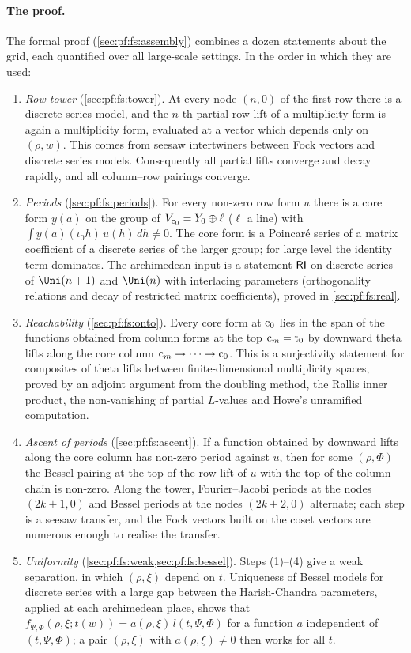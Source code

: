 \paragraph{The proof.}
The formal proof (\cref{sec:pf:fs:assembly}) combines a dozen statements about the grid, each quantified over all
large-scale settings. In the order in which they are used:
\begin{enumerate}[label=(\arabic*)]
\item \emph{Row tower} (\cref{sec:pf:fs:tower}). At every node $(n,0)$ of the first row there is a discrete series
model, and the $n$-th partial row lift of a multiplicity form is again a multiplicity form, evaluated at a vector
which depends only on $(\rho,w)$. This comes from seesaw intertwiners between Fock vectors and discrete series
models. Consequently all partial lifts converge and decay rapidly, and all column--row pairings converge.
\item \emph{Periods} (\cref{sec:pf:fs:periods}). For every non-zero row form $u$ there is a core form $y(a)$ on the group
of $V_{\mathrm{c}_0}=Y_0\oplus\ell$ ($\ell$ a line) with $\int y(a)(\iota_0h)\,u(h)\,dh\ne0$. The core form is a Poincar\'e series of
a matrix coefficient of a discrete series of the larger group; for large level the identity term dominates. The
archimedean input is a statement $\mathsf{RI}$ on discrete series of $\Uni(n+1)$ and $\Uni(n)$ with interlacing parameters
(orthogonality relations and decay of restricted matrix coefficients), proved in \cref{sec:pf:fs:real}.
\item \emph{Reachability} (\cref{sec:pf:fs:onto}). Every core form at $\mathrm{c}_0$ lies in the span of the functions obtained
from column forms at the top $\mathrm{c}_m=\mathrm{t}_0$ by downward theta lifts along the core column $\mathrm{c}_m\to\cdots\to\mathrm{c}_0$. This
is a surjectivity statement for composites of theta lifts between finite-dimensional multiplicity spaces, proved by
an adjoint argument from the doubling method, the Rallis inner product, the non-vanishing of partial $L$-values and
Howe's unramified computation.
\item \emph{Ascent of periods} (\cref{sec:pf:fs:ascent}). If a function obtained by downward lifts along the core column
has non-zero period against $u$, then for some $(\rho,\Phi)$ the Bessel pairing at the top of the row lift of $u$ with
the top of the column chain is non-zero. Along the tower, Fourier--Jacobi periods at the nodes $(2k+1,0)$ and Bessel
periods at the nodes $(2k+2,0)$ alternate; each step is a seesaw transfer, and the Fock vectors built on the coset
vectors are numerous enough to realise the transfer.
\item \emph{Uniformity} (\cref{sec:pf:fs:weak,sec:pf:fs:bessel}). Steps (1)--(4) give a weak separation, in which
$(\rho,\xi)$ depend on $t$. Uniqueness of Bessel models for discrete series with a large gap between the
Harish-Chandra parameters, applied at each archimedean place, shows that
$f_{\Psi,\Phi}(\rho,\xi;t(w))=a(\rho,\xi)\,l(t,\Psi,\Phi)$ for a function $a$ independent of $(t,\Psi,\Phi)$; a pair
$(\rho,\xi)$ with $a(\rho,\xi)\ne0$ then works for all $t$.
\end{enumerate}
